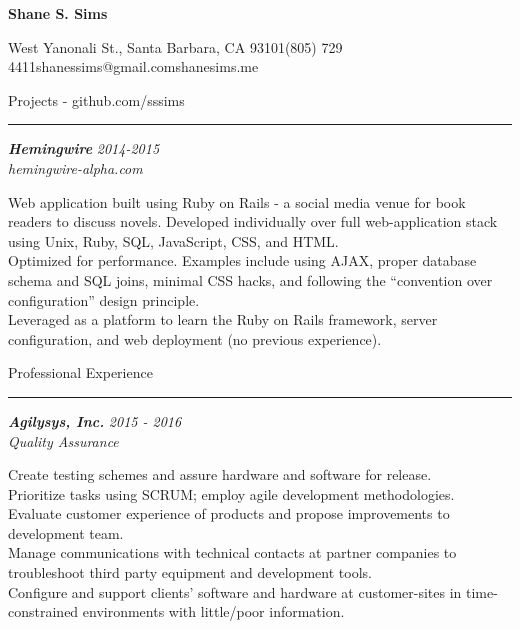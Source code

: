 \documentclass[10pt]{article}
\newcommand{\simsbullet}{{\raisebox{2pt}{\tiny $\bullet$}}\hspace{8pt}}
\newcommand{\midlinesimsbullet}{\hspace{4pt}{\raisebox{2pt}{\tiny $\bullet$}}\hspace{5pt}}
\begin{document}

{\centerline{\huge\bf Shane S. Sims}}
\vskip 8pt
{\centerline{ West Yanonali St., Santa Barbara, CA 93101{\midlinesimsbullet}(805) 729 4411{\midlinesimsbullet}shanessims@gmail.com{\midlinesimsbullet}shanesims.me}}

\vskip 12pt



{\Large Projects {\small - github.com/sssims}}
\vskip 1pt
\hrule
\vskip 6pt
{\bfseries\itshape\sffamily Hemingwire} \hfill \textsf{\textit{2014-2015}}\\
\textit{\textsf{hemingwire-alpha.com}} 
\vskip 4pt

\setlength{\leftskip}{16pt}

Web application built using Ruby on Rails - a social media venue for book readers to discuss novels.
\vskip 4pt
\simsbullet Developed individually over full web-application stack using Unix, Ruby, SQL, JavaScript, CSS, and HTML.\\
\simsbullet Optimized for performance. Examples include using AJAX, proper database schema and SQL joins, minimal CSS hacks, and following the ``convention over configuration'' design principle. \\
\simsbullet Leveraged as a platform to learn the Ruby on Rails framework, server configuration, and web deployment (no previous experience).

\setlength{\leftskip}{0pt}

\vskip 14pt

{\Large Professional Experience}
\vskip 2pt
\hrule
\vskip 6pt

{\bfseries\itshape\sffamily Agilysys, Inc.} \hfill \textsf{\textit{2015 - 2016}} \\
\textit{\textsf{Quality Assurance}}
\vskip 4pt

\setlength{\leftskip}{16pt}

\simsbullet Create testing schemes and assure hardware and software for release.  \\
\simsbullet Prioritize tasks using SCRUM; employ agile development methodologies. \\
\simsbullet Evaluate customer experience of products and propose improvements to development team. \\
\simsbullet Manage communications with technical contacts at partner companies to troubleshoot third party equipment and development tools. \\
\simsbullet Configure and support clients' software and hardware at customer-sites in time-constrained environments with little/poor information. 
\end{document}
